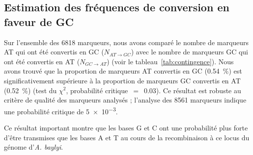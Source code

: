 \subsection{Estimation des fréquences de conversion en faveur de GC}
\label{subsec:result-freq}

Sur l'ensemble des \num{6818} marqueurs, nous avons comparé le nombre de
marqueurs AT qui ont été convertis en GC ($N_{AT \rightarrow GC}$) avec le
nombre de marqueurs GC qui ont été convertis en AT ($N_{GC \rightarrow AT}$)
(voir le tableau~\ref{tab:contingence}). Nous avons trouvé que la proportion de
marqueurs AT convertis en GC (\SI{0.54}{\percent}) est significativement
supérieure à la proportion de marqueurs GC convertis en AT (\SI{.52}{\percent})
(test du $\chi^2$, probabilité critique~\(=\)~\num{0.03}). Ce résultat est
robuste au critère de qualité des marqueurs analysés ; l'analyse des \num{8561}
marqueurs indique une probabilité critique de \num{5e-3}.

Ce résultat important montre que les bases G et C ont une probabilité plus
forte d'être transmises que les bases A et T au cours de la recombinaison à ce
locus du génome d'\emph{A. baylyi}.

\newpage
